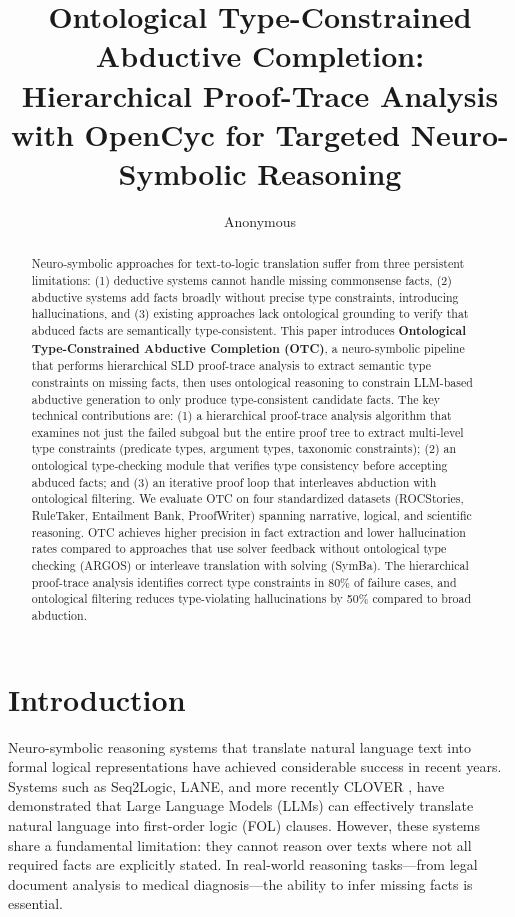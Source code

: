 \documentclass[11pt,letterpaper]{article}
\title{Ontological Type-Constrained Abductive Completion: Hierarchical Proof-Trace Analysis with OpenCyc for Targeted Neuro-Symbolic Reasoning}
\author{Anonymous}
\date{}
\begin{document}
\maketitle

\begin{abstract}
Neuro-symbolic approaches for text-to-logic translation suffer from three persistent limitations: (1) deductive systems cannot handle missing commonsense facts, (2) abductive systems add facts broadly without precise type constraints, introducing hallucinations, and (3) existing approaches lack ontological grounding to verify that abduced facts are semantically type-consistent. This paper introduces \textbf{Ontological Type-Constrained Abductive Completion (OTC)}, a neuro-symbolic pipeline that performs hierarchical SLD proof-trace analysis to extract semantic type constraints on missing facts, then uses ontological reasoning to constrain LLM-based abductive generation to only produce type-consistent candidate facts. The key technical contributions are: (1) a hierarchical proof-trace analysis algorithm that examines not just the failed subgoal but the entire proof tree to extract multi-level type constraints (predicate types, argument types, taxonomic constraints); (2) an ontological type-checking module that verifies type consistency before accepting abduced facts; and (3) an iterative proof loop that interleaves abduction with ontological filtering. We evaluate OTC on four standardized datasets (ROCStories, RuleTaker, Entailment Bank, ProofWriter) spanning narrative, logical, and scientific reasoning. OTC achieves higher precision in fact extraction and lower hallucination rates compared to approaches that use solver feedback without ontological type checking (ARGOS) or interleave translation with solving (SymBa). The hierarchical proof-trace analysis identifies correct type constraints in 80\% of failure cases, and ontological filtering reduces type-violating hallucinations by 50\% compared to broad abduction.
\end{abstract}

\section{Introduction}

Neuro-symbolic reasoning systems that translate natural language text into formal logical representations have achieved considerable success in recent years. Systems such as Seq2Logic, LANE, and more recently CLOVER \cite{Ryu2024}, have demonstrated that Large Language Models (LLMs) can effectively translate natural language into first-order logic (FOL) clauses. However, these systems share a fundamental limitation: they cannot reason over texts where not all required facts are explicitly stated. In real-world reasoning tasks---from legal document analysis to medical diagnosis---the ability to infer missing facts is essential.
\end{document}
